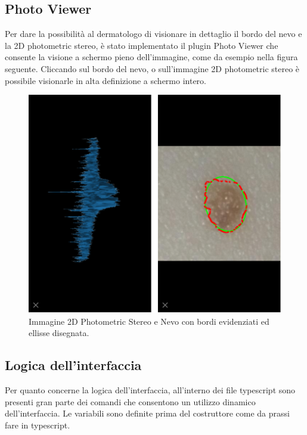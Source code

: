 {\subsection{Photo Viewer}
Per dare la possibilità al dermatologo di visionare in dettaglio il bordo del nevo e la 2D photometric stereo, è stato implementato il plugin Photo Viewer che consente la visione a schermo pieno dell'immagine, come da esempio nella figura seguente.
Cliccando sul bordo del nevo, o sull'immagine 2D photometric stereo è possibile visionarle in alta definizione a schermo intero.
\begin{figure}[h]
	\begin{center}
		\includegraphics[scale=0.7]{figure/capitolo5/photoviewer.png}
	\end{center}
	\caption{Immagine 2D Photometric Stereo e Nevo con bordi evidenziati ed ellisse disegnata.}	
\end{figure}
\newpage
\subsection{Logica dell'interfaccia}
Per quanto concerne la logica dell'interfaccia, all'interno dei file typescript sono presenti gran parte dei comandi che consentono un utilizzo dinamico dell'interfaccia.
Le variabili sono definite prima del costruttore come da prassi fare in typescript.
}
